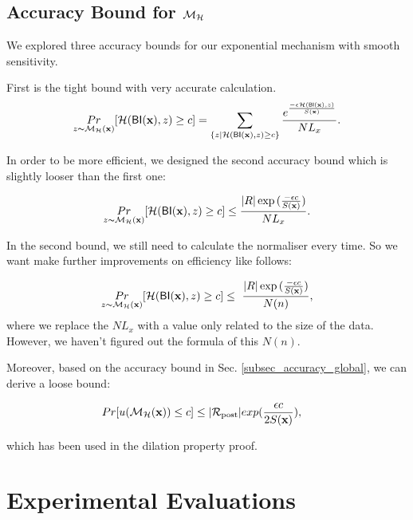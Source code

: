 \documentclass{article}
\begin{document}
\subsection{Accuracy Bound for $\mathcal{M}_{\mathcal{H}}$}
\label{subsec_accuracy_smoo}
We explored three accuracy bounds for our exponential mechanism with smooth sensitivity.

First is the tight bound with very accurate calculation.
\begin{equation*}
\underset{z \thicksim \mathcal{M}_{\mathcal{H}}(\textbf{x})}{Pr}[ \mathcal{H}(\mathsf{BI}(\textbf{x}), z) \geq c] = \sum\limits_{\{z | \mathcal{H}(\mathsf{BI}(\textbf{x}), z) \geq c\}} \frac{e^{\frac{- \epsilon \mathcal{H}(\mathsf{BI}(\textbf{x}), z)}{S(\textbf{x})}}}{NL_x}.
\end{equation*}

In order to be more efficient, we designed the second accuracy bound which is slightly looser than the first one:

\begin{equation*}
\underset{z \thicksim \mathcal{M}_{\mathcal{H}}(\textbf{x})}{Pr}[ \mathcal{H}(\mathsf{BI}(\textbf{x}), z) \geq c] \leq \frac{|R| \exp{(\frac{- \epsilon c}{S(\textbf{x})}})}{NL_x}.
\end{equation*}

In the second bound, we still need to calculate the normaliser every time. So we want make further improvements on efficiency like follows:

\begin{equation*}
\underset{z \thicksim \mathcal{M}_{\mathcal{H}}(\textbf{x})}{Pr}[ \mathcal{H}(\mathsf{BI}(\textbf{x}), z) \geq c] \leq \ \frac{|R| \exp{(\frac{- \epsilon c}{S(\textbf{x})}})}{N(n)},
\end{equation*}
where we replace the $NL_x$ with a value only related to the size of the data. However, we haven't figured out the formula of this $N(n)$.

Moreover, based on the accuracy bound in Sec. \ref{subsec_accuracy_global}, we can derive a loose bound:

\begin{equation*}
\begin{split}
Pr[u(\mathcal{M}_{\mathcal{H}}(\textbf{x})) \leq c] 
& \leq |\mathcal{R}_{\textup{post}}|exp(\frac{\epsilon c}{2 S(\textbf{x})}),
\end{split}
\end{equation*}

which has been used in the dilation property proof.



\section{Experimental Evaluations}
\label{sec_experiment}
\end{document}
